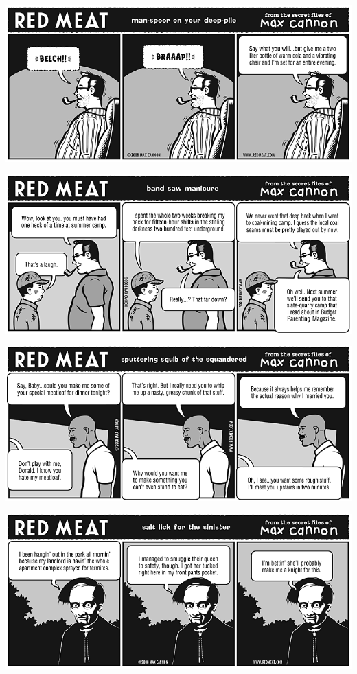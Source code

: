 \documentclass[a4paper,twoside,11pt]{article}
\begin{document}
\includegraphics[width=\textwidth]{redmeat_2008-06-03.png}



\includegraphics[width=\textwidth]{redmeat_2008-06-10.png}



\includegraphics[width=\textwidth]{redmeat_2008-06-17.png}



\includegraphics[width=\textwidth]{redmeat_2008-06-24.png}
\end{document}
